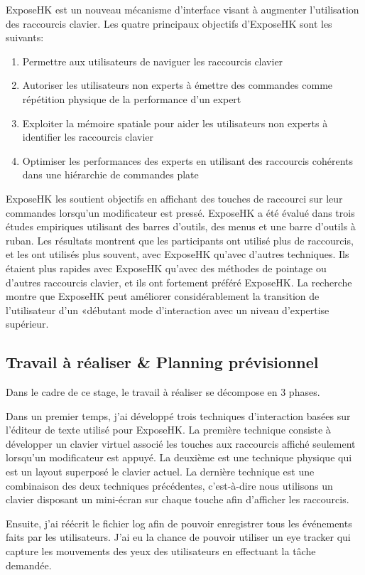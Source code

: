 \documentclass[12pt,a4paper]{article}
\newcommand\tab[1][0.65cm]{\hspace*{#1}}
\begin{document}
ExposeHK est un nouveau mécanisme d'interface visant à augmenter l'utilisation des raccourcis clavier. Les quatre principaux objectifs d'ExposeHK sont les suivants:
\begin{enumerate}
	\item Permettre aux utilisateurs de naviguer les raccourcis clavier
	\item Autoriser les utilisateurs non experts à émettre des commandes comme répétition physique de la performance d'un expert
	\item Exploiter la mémoire spatiale pour aider les utilisateurs non experts à identifier les raccourcis clavier
	\item Optimiser les performances des experts en utilisant des raccourcis cohérents dans une hiérarchie de commandes plate
\end{enumerate}
\tab ExposeHK les soutient objectifs en affichant des touches de raccourci sur leur commandes lorsqu'un modificateur est pressé. ExposeHK a été évalué dans trois études empiriques utilisant des barres d'outils, des menus et une barre d'outils à ruban. Les résultats montrent que les participants ont utilisé plus de raccourcis, et les ont utilisés plus souvent, avec ExposeHK qu'avec d'autres techniques. Ils étaient plus rapides avec ExposeHK qu'avec des méthodes de pointage ou d'autres raccourcis clavier, et ils ont fortement préféré ExposeHK. La recherche montre que ExposeHK peut améliorer considérablement la transition de l'utilisateur d'un «débutant mode d'interaction avec un niveau d'expertise supérieur.\cite{2,3}
\subsection{Travail à réaliser \& Planning prévisionnel}
Dans le cadre de ce stage, le travail à réaliser se décompose en 3 phases.

Dans un premier temps, j'ai développé trois techniques d'interaction basées sur l'éditeur de texte utilisé pour ExposeHK. La première technique consiste à développer un clavier virtuel associé les touches aux  raccourcis affiché seulement lorsqu'un modificateur est appuyé. La deuxième est une technique physique qui est un layout superposé le clavier actuel. La dernière technique est une combinaison des deux techniques précédentes, c'est-à-dire nous utilisons un clavier disposant un mini-écran sur chaque touche afin d'afficher les raccourcis.

Ensuite, j'ai réécrit le fichier log afin de pouvoir enregistrer tous les événements faits par les utilisateurs. J'ai eu la chance de pouvoir utiliser un eye tracker qui capture les mouvements des yeux des utilisateurs en effectuant la tâche demandée.
\end{document}
